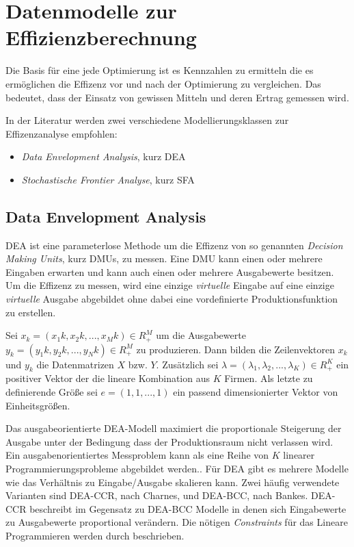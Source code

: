 \section{Datenmodelle zur Effizienzberechnung}
Die Basis für eine jede Optimierung ist es Kennzahlen zu ermitteln die es ermöglichen die Effizenz vor und nach der Optimierung zu vergleichen. Das bedeutet, dass der Einsatz von gewissen Mitteln und deren Ertrag gemessen wird. 

In der Literatur werden zwei verschiedene Modellierungsklassen zur Effizenzanalyse empfohlen:\cite{jour:Curtiss2012}\cite{conf:Jian2013}
\begin{itemize}
	\item \textit{Data Envelopment Analysis}, kurz DEA
	\item \textit{Stochastische Frontier Analyse}, kurz SFA
\end{itemize}

\subsection{Data Envelopment Analysis}

DEA ist eine parameterlose Methode um die Effizenz von so genannten \textit{Decision Making Units}, kurz DMUs, zu messen. Eine DMU kann einen oder mehrere Eingaben erwarten und kann auch einen oder mehrere Ausgabewerte besitzen. Um die Effizenz zu messen, wird eine einzige \textit{virtuelle} Eingabe auf eine einzige \textit{virtuelle} Ausgabe abgebildet ohne dabei eine vordefinierte Produktionsfunktion zu erstellen.\cite{jour:Cullinane2006}

Sei $x_k=(x_1k,x_2k,...,x_Mk) \in R^{M}_+$ um die Ausgabewerte $y_k=(y_1k,y_2k,...,y_Nk) \in R^{M}_+$ zu produzieren. Dann bilden die Zeilenvektoren $x_k$ und $y_k$ die Datenmatrizen $X$ bzw. $Y$. Zusätzlich sei $\lambda = (\lambda_1,\lambda_2,...,\lambda_K) \in R^{K}_+$ ein positiver Vektor der die lineare Kombination aus $K$ Firmen. Als letzte zu definierende Größe sei $e = (1,1,...,1)$ ein passend dimensionierter Vektor von Einheitsgrößen.\cite{jour:Cullinane2006}

Das ausgabeorientierte DEA-Modell maximiert die proportionale Steigerung der Ausgabe unter der Bedingung dass der Produktionsraum nicht verlassen wird. Ein ausgabenorientiertes Messproblem kann als eine Reihe von $K$ linearer Programmierungsprobleme abgebildet werden.\cite{jour:Cullinane2006}. Für DEA gibt es mehrere Modelle wie das Verhältnis zu Eingabe/Ausgabe skalieren kann. Zwei häufig verwendete Varianten sind DEA-CCR, nach Charnes, und DEA-BCC, nach Bankes. DEA-CCR beschreibt im Gegensatz zu DEA-BCC Modelle in denen sich Eingabewerte zu Ausgabewerte proportional verändern. Die nötigen \textit{Constraints} für das Lineare Programmieren werden durch beschrieben.

